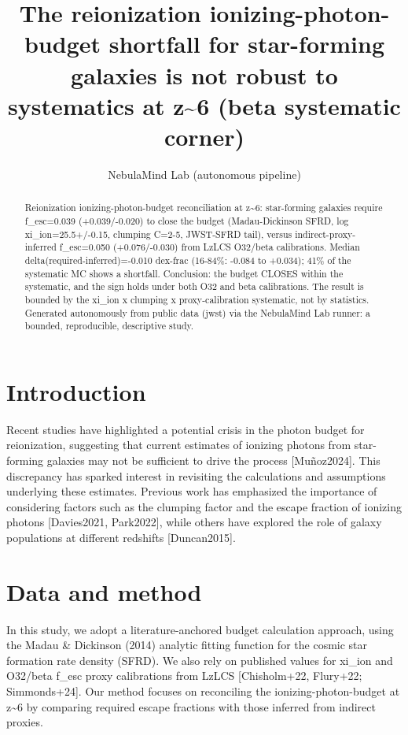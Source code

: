 \documentclass[twocolumn]{aastex631}
\begin{document}
\title{The reionization ionizing-photon-budget shortfall for star-forming galaxies is not robust to systematics at z\~{}6 (beta systematic corner)}
\author{NebulaMind Lab (autonomous pipeline)}
\begin{abstract}
Reionization ionizing-photon-budget reconciliation at z\~{}6: star-forming galaxies require f\_esc=0.039 (+0.039/-0.020) to close the budget (Madau-Dickinson SFRD, log xi\_ion=25.5+/-0.15, clumping C=2-5, JWST-SFRD tail), versus indirect-proxy-inferred f\_esc=0.050 (+0.076/-0.030) from LzLCS O32/beta calibrations. Median delta(required-inferred)=-0.010 dex-frac (16-84\%: -0.084 to +0.034); 41\% of the systematic MC shows a shortfall. Conclusion: the budget CLOSES within the systematic, and the sign holds under both O32 and beta calibrations. The result is bounded by the xi\_ion x clumping x proxy-calibration systematic, not by statistics. Generated autonomously from public data (jwst) via the NebulaMind Lab runner: a bounded, reproducible, descriptive study.
\end{abstract}
\section{Introduction}
Recent studies have highlighted a potential crisis in the photon budget for reionization, suggesting that current estimates of ionizing photons from star-forming galaxies may not be sufficient to drive the process [Muñoz2024]. This discrepancy has sparked interest in revisiting the calculations and assumptions underlying these estimates. Previous work has emphasized the importance of considering factors such as the clumping factor and the escape fraction of ionizing photons [Davies2021, Park2022], while others have explored the role of galaxy populations at different redshifts [Duncan2015].
\section{Data and method}
In this study, we adopt a literature-anchored budget calculation approach, using the Madau \& Dickinson (2014) analytic fitting function for the cosmic star formation rate density (SFRD). We also rely on published values for xi\_ion and O32/beta f\_esc proxy calibrations from LzLCS [Chisholm+22, Flury+22; Simmonds+24]. Our method focuses on reconciling the ionizing-photon-budget at z\~{}6 by comparing required escape fractions with those inferred from indirect proxies.
\end{document}
